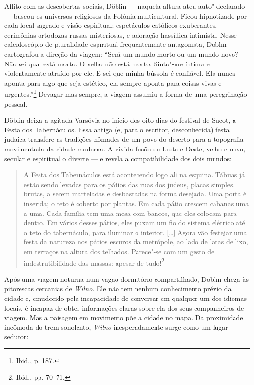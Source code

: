 Aflito com as descobertas sociais, Döblin --- naquela altura ateu
auto"-declarado --- buscou os universos religiosos da Polônia
multicultural. Ficou hipnotizado por cada local sagrado e visão
espiritual: espetáculos católicos exuberantes, cerimônias ortodoxas
russas misteriosas, e adoração hassídica intimista. Nesse caleidoscópio
de pluralidade espiritual frequentemente antagonista, Döblin cartografou
a direção da viagem: ``Será um mundo morto ou um mundo novo? Não sei
qual está morto. O velho não está morto. Sinto"-me íntima e violentamente
atraído por ele. E sei que minha bússola é confiável. Ela nunca aponta
para algo que seja estético, ela sempre aponta para coisas vivas e
urgentes.''\footnote{Ibid., p. 187.} Devagar mas sempre, a viagem
assumiu a forma de uma peregrinação pessoal.

Döblin deixa a agitada Varsóvia no início dos oito dias do festival de
Sucot, a Festa dos Tabernáculos. Essa antiga (e, para o escritor,
desconhecida) festa judaica transfere as tradições nômades de um povo do
deserto para a topografia movimentada da cidade moderna. A vívida fusão
de Leste e Oeste, velho e novo, secular e espiritual o diverte --- e
revela a compatibilidade dos dois mundos:

\begin{quote}
A Festa dos Tabernáculos está acontecendo logo ali na esquina. Tábuas já
estão sendo levadas para os pátios das ruas dos judeus, placas simples,
brutas, a serem marteladas e desbastadas na forma desejada. Uma porta é
inserida; o teto é coberto por plantas. Em cada pátio crescem cabanas
uma a uma. Cada família tem uma mesa com bancos, que eles colocam para
dentro. Em vários desses pátios, eles puxam um fio do sistema elétrico
até o teto do tabernáculo, para iluminar o interior. [\ldots{}] Agora vão
festejar uma festa da natureza nos pátios escuros da metrópole, ao lado
de latas de lixo, em terraços na altura dos telhados. Parece"-se com um
gesto de indestrutibilidade das massas: apesar de tudo!\footnote{Ibid., pp. 70--71.} 
\end{quote}

Após uma viagem noturna num vagão dormitório compartilhado, Döblin chega
às pitorescas cercanias de \textit{Wilno}. Ele não tem nenhum conhecimento prévio
da cidade e, emudecido pela incapacidade de conversar em qualquer um dos
idiomas locais, é incapaz de obter informações claras sobre ela dos seus
companheiros de viagem. Mas a paisagem em movimento põe a cidade no
mapa. Da proximidade incômoda do trem sonolento, \textit{Wilno} inesperadamente
surge como um lugar sedutor:

